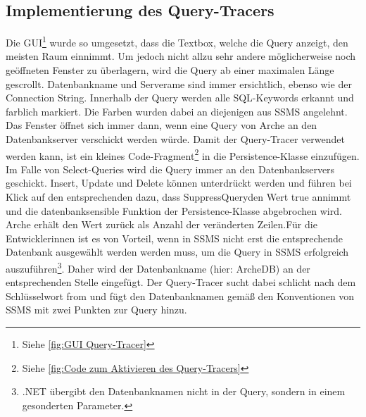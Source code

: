 \documentclass[11pt,toc=sectionentrywithoutdots, 
headheight=44pt, headings=optiontoheadandtoc, hyperfootnotes=false, hypertexnames=false]{scrartcl}
\newcommand\extendedref[1]{Siehe \ref{#1}}
\begin{document}
\subsection{Implementierung des Query-Tracers}
Die GUI\footnote{\extendedref{fig:GUI Query-Tracer}} wurde so umgesetzt, dass die Textbox, welche die Query anzeigt, den meisten Raum einnimmt. Um jedoch nicht allzu sehr andere möglicherweise noch geöffneten Fenster zu überlagern, wird die Query ab einer maximalen Länge gescrollt. Datenbankname und Serverame sind immer ersichtlich, ebenso wie der Connection String. Innerhalb der Query werden alle SQL-Keywords erkannt und farblich markiert. Die Farben wurden dabei an diejenigen aus SSMS angelehnt. Das Fenster öffnet sich immer dann, wenn eine Query von Arche an den Datenbankserver verschickt werden würde. Damit der Query-Tracer verwendet werden kann, ist ein kleines Code-Fragment\footnote{\extendedref{fig:Code zum Aktivieren des Query-Tracers}} in die Persistence-Klasse einzufügen. Im Falle von Select-Queries wird die Query immer an den Datenbankservers geschickt. Insert, Update und Delete können unterdrückt werden und führen bei Klick auf den entsprechenden dazu, dass \glqq SuppressQuery\grqq den Wert \glqq true \grqq{} annimmt und die datenbanksensible Funktion der Persistence-Klasse abgebrochen wird. Arche erhält den Wert \grqq{} zurück als Anzahl der veränderten Zeilen.\newline\newline Für die Entwicklerinnen ist es von Vorteil, wenn in SSMS nicht erst die entsprechende Datenbank ausgewählt werden werden muss, um die Query in SSMS erfolgreich auszuführen\footnote{.NET übergibt den Datenbanknamen nicht in der Query, sondern in einem gesonderten Parameter.}. Daher wird der Datenbankname (hier: \glqq ArcheDB\grqq{}) an der entsprechenden Stelle eingefügt. Der Query-Tracer sucht dabei schlicht nach dem Schlüsselwort \glqq from\grqq{} und fügt den Datenbanknamen gemäß den Konventionen von SSMS mit zwei Punkten zur Query hinzu.
\end{document}
